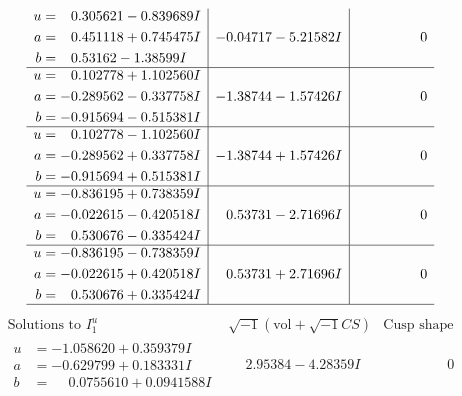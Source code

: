 \documentclass[1p]{elsarticle_modified}
\theoremstyle{definition}
\newcommand{\I}{\sqrt{-1}}
\begin{document}
$$\begin{array}{c|c|c}
\begin{aligned}
u &= \phantom{-}0.305621 - 0.839689 I \\
a &= \phantom{-}0.451118 + 0.745475 I \\
b &= \phantom{-}0.53162 - 1.38599 I\end{aligned}
 & -0.04717 - 5.21582 I & \phantom{-0.000000 } 0 \\ \hline\begin{aligned}
u &= \phantom{-}0.102778 + 1.102560 I \\
a &= -0.289562 - 0.337758 I \\
b &= -0.915694 - 0.515381 I\end{aligned}
 & -1.38744 - 1.57426 I & \phantom{-0.000000 } 0 \\ \hline\begin{aligned}
u &= \phantom{-}0.102778 - 1.102560 I \\
a &= -0.289562 + 0.337758 I \\
b &= -0.915694 + 0.515381 I\end{aligned}
 & -1.38744 + 1.57426 I & \phantom{-0.000000 } 0 \\ \hline\begin{aligned}
u &= -0.836195 + 0.738359 I \\
a &= -0.022615 - 0.420518 I \\
b &= \phantom{-}0.530676 - 0.335424 I\end{aligned}
 & \phantom{-}0.53731 - 2.71696 I & \phantom{-0.000000 } 0 \\ \hline\begin{aligned}
u &= -0.836195 - 0.738359 I \\
a &= -0.022615 + 0.420518 I \\
b &= \phantom{-}0.530676 + 0.335424 I\end{aligned}
 & \phantom{-}0.53731 + 2.71696 I & \phantom{-0.000000 } 0\\
 \hline 
 \end{array}$$\newpage$$\begin{array}{c|c|c}  
\text{Solutions to }I^u_{1}& \I (\text{vol} + \sqrt{-1}CS) & \text{Cusp shape}\\
 \hline 
\begin{aligned}
u &= -1.058620 + 0.359379 I \\
a &= -0.629799 + 0.183331 I \\
b &= \phantom{-}0.0755610 + 0.0941588 I\end{aligned}
 & \phantom{-}2.95384 - 4.28359 I & \phantom{-0.000000 } 0 \\ \hline\begin{aligned}

\end{aligned}
\end{array}$$
\end{document}
